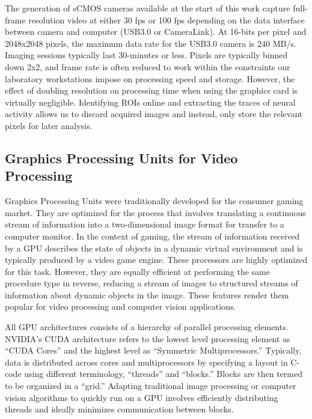 The generation of sCMOS cameras available at the start of this work capture full-frame resolution video at either 30 fps or 100 fps depending on the data interface between camera and computer (USB3.0 or CameraLink).
At 16-bits per pixel and 2048x2048 pixels, the maximum data rate for the USB3.0 camera is 240 MB/s.
Imaging sessions typically last 30-minutes or less.
Pixels are typically binned down 2x2, and frame rate is often reduced to work within the constraints our laboratory workstations impose on processing speed and storage.
However, the effect of doubling resolution on processing time when using the graphics card is virtually negligible.
Identifying ROIs online and extracting the traces of neural activity allows us to discard acquired images and instead, only store the relevant pixels for later analysis.

\subsection{Graphics Processing Units for Video Processing}\label{sec:graphics-processing-units-for-video-processing}

Graphics Processing Units were traditionally developed for the consumer gaming market.
They are optimized for the process that involves translating a continuous stream of information into a two-dimensional image format for transfer to a computer monitor.
In the context of gaming, the stream of information received by a GPU describes the state of objects in a dynamic virtual environment and is typically produced by a video game engine.
These processors are highly optimized for this task.
However, they are equally efficient at performing the same procedure type in reverse, reducing a stream of images to structured streams of information about dynamic objects in the image.
These features render them popular for video processing and computer vision applications.

All GPU architectures consists of a hierarchy of parallel processing elements.
NVIDIA's CUDA architecture refers to the lowest level processing element as ``CUDA Cores'' and the highest level as ``Symmetric Multiprocessors.''
Typically, data is distributed across cores and multiprocessors by specifying a layout in C-code using
different terminology, ``threads'' and ``blocks.'' Blocks are then termed to be organized in a ``grid.''
Adapting traditional image processing or computer vision algorithms to quickly run on a GPU involves efficiently distributing threads and ideally minimizes communication between blocks.

